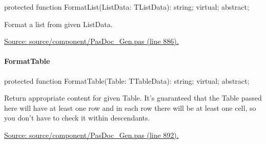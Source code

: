 \documentclass{report}
\newif\ifpdf
\begin{document}
\label{PasDoc_Gen.TDocGenerator-FormatList}
\begin{list}{}{
\setlength{\itemindent}{0cm}
\setlength{\listparindent}{0cm}
\setlength{\leftmargin}{\evensidemargin}
\addtolength{\leftmargin}{\tmplength}
\settowidth{\labelsep}{X}
\addtolength{\leftmargin}{\labelsep}
\setlength{\labelwidth}{\tmplength}
}
\item[\textbf{Declaration}\hfill]
\ifpdf
\begin{flushleft}
\fi
\begin{ttfamily}
protected function FormatList(ListData: TListData): string; virtual; abstract;\end{ttfamily}

\ifpdf
\end{flushleft}
\fi

\par
\item[\textbf{Description}]
Format a list from given ListData.\par
\href{https://github.com/pasdoc/pasdoc/blob/master/source/component/PasDoc_Gen.pas#L886}{Source: source/component/PasDoc{\_}Gen.pas (line 886).}

\end{list}
\paragraph*{FormatTable}\hspace*{\fill}

\label{PasDoc_Gen.TDocGenerator-FormatTable}
\begin{list}{}{
\setlength{\itemindent}{0cm}
\setlength{\listparindent}{0cm}
\setlength{\leftmargin}{\evensidemargin}
\addtolength{\leftmargin}{\tmplength}
\settowidth{\labelsep}{X}
\addtolength{\leftmargin}{\labelsep}
\setlength{\labelwidth}{\tmplength}
}
\item[\textbf{Declaration}\hfill]
\ifpdf
\begin{flushleft}
\fi
\begin{ttfamily}
protected function FormatTable(Table: TTableData): string; virtual; abstract;\end{ttfamily}

\ifpdf
\end{flushleft}
\fi

\par
\item[\textbf{Description}]
Return appropriate content for given Table. It's guaranteed that the Table passed here will have at least one row and in each row there will be at least one cell, so you don't have to check it within descendants.\par
\href{https://github.com/pasdoc/pasdoc/blob/master/source/component/PasDoc_Gen.pas#L892}{Source: source/component/PasDoc{\_}Gen.pas (line 892).}

\end{list}
\end{document}

